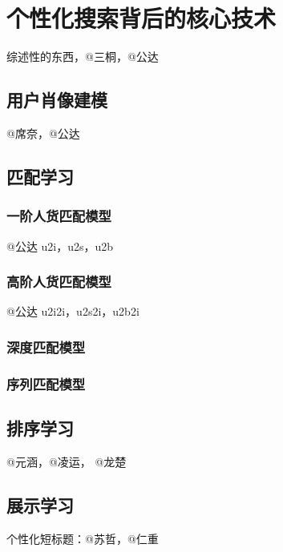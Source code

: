 
\chapter{个性化搜索背后的核心技术}
\thispagestyle{empty}

\setlength{\fboxrule}{0pt}\setlength{\fboxsep}{0cm}
\noindent\shadowbox{
\begin{tcolorbox}[arc=0mm,colback=lightblue,colframe=darkblue,title=学习目标与要求]

\end{tcolorbox}}
\setlength{\fboxrule}{1pt}\setlength{\fboxsep}{4pt} 

综述性的东西，@三桐，@公达

\section{用户肖像建模} 
	@席奈，@公达 

\section{匹配学习}
	
\subsection{一阶人货匹配模型} 
	@公达 u2i，u2s，u2b 

\subsection{高阶人货匹配模型} 
	@公达 u2i2i，u2s2i，u2b2i 

\subsection{深度匹配模型} 

\subsection{序列匹配模型} 
	
\section{排序学习}
	@元涵，@凌运， @龙楚

\section{展示学习}
	个性化短标题：@苏哲，@仁重 

